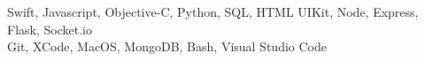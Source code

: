    Swift, Javascript, Objective-C, Python, SQL, HTML
   UIKit, Node, Express, Flask, Socket.io\\
  Git, XCode, MacOS, MongoDB, Bash, Visual Studio Code
